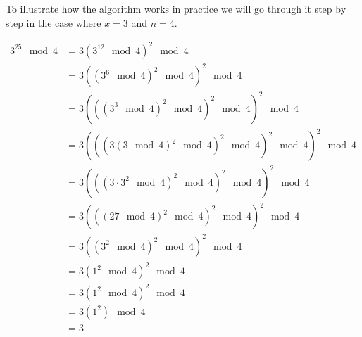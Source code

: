 \documentclass{article}
\theoremstyle{plain}
\begin{document}
To illustrate how the algorithm works in practice we will go through it step by step in the case where $x=3$ and $n = 4$.

\begin{align*}
3^{25}\mod 4 &= 3(3^{12} \mod 4)^2 \mod 4 \\
&= 3((3^6 \mod 4)^2 \mod 4)^2 \mod 4 \\
&= 3(((3^3 \mod 4)^2 \mod 4)^2 \mod 4)^2 \mod 4 \\
&= 3(((3(3 \mod 4)^2\mod 4)^2 \mod 4)^2 \mod 4)^2 \mod 4\\
&=3(((3\cdot3^2\mod 4)^2\mod 4)^2\mod 4)^2 \mod 4 \\
&=3(((27\mod 4)^2\mod 4)^2\mod 4)^2 \mod 4 \\
&=3((3^2\mod 4)^2\mod 4)^2 \mod 4 \\
&=3(1^2\mod 4)^2 \mod 4 \\
&=3(1^2\mod 4)^2 \mod 4 \\
&= 3(1^2) \mod 4\\
&= 3
\end{align*}
\end{document}
